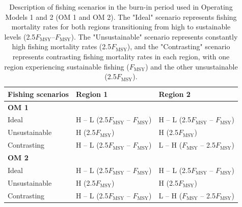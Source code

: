 \begin{table}[!ht]
\centering
\caption{Description of fishing scenarios in the burn-in period used in Operating Models 1 and 2 (OM 1 and OM 2). The "Ideal" scenario represents fishing mortality rates for both regions transitioning from high to sustainable levels (2.5\(F_{\text{MSY}}\)–\(F_{\text{MSY}}\)). The "Unsustainable" scenario represents constantly high fishing mortality rates (2.5\(F_{\text{MSY}}\)), and the "Contrasting" scenario represents contrasting fishing mortality rates in each region, with one region experiencing sustainable fishing (\(F_{\text{MSY}}\)) and the other unsustainable (2.5\(F_{\text{MSY}}\)).
}
\label{F_scenario_table}
\begin{tabular}{p{5cm} p{5cm} p{5cm}}
\toprule
\textbf{Fishing scenarios} & \textbf{Region 1} & \textbf{Region 2} \\
\midrule
\textbf{OM 1} & & \\
Ideal & H – L (2.5\(F_{\text{MSY}}\) – \(F_{\text{MSY}}\)) & H – L (2.5\(F_{\text{MSY}}\) – \(F_{\text{MSY}}\)) \\
Unsustainable & H (2.5\(F_{\text{MSY}}\)) & H (2.5\(F_{\text{MSY}}\)) \\
Contrasting & H – L (2.5\(F_{\text{MSY}}\) – \(F_{\text{MSY}}\)) & L – H (\(F_{\text{MSY}}\) – 2.5\(F_{\text{MSY}}\)) \\
\textbf{OM 2} & & \\
Ideal & H – L (2.5\(F_{\text{MSY}}\) – \(F_{\text{MSY}}\)) & H – L (2.5\(F_{\text{MSY}}\) – \(F_{\text{MSY}}\)) \\
Unsustainable & H (2.5\(F_{\text{MSY}}\)) & H (2.5\(F_{\text{MSY}}\)) \\
Contrasting & H – L (2.5\(F_{\text{MSY}}\) – \(F_{\text{MSY}}\)) & L – H (\(F_{\text{MSY}}\) – 2.5\(F_{\text{MSY}}\)) \\
\bottomrule
\end{tabular}
\end{table}
